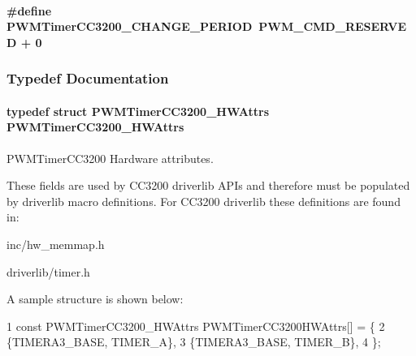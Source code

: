 \paragraph[{P\+W\+M\+Timer\+C\+C3200\+\_\+\+C\+H\+A\+N\+G\+E\+\_\+\+P\+E\+R\+I\+O\+D}]{\setlength{\rightskip}{0pt plus 5cm}\#define P\+W\+M\+Timer\+C\+C3200\+\_\+\+C\+H\+A\+N\+G\+E\+\_\+\+P\+E\+R\+I\+O\+D~{\bf P\+W\+M\+\_\+\+C\+M\+D\+\_\+\+R\+E\+S\+E\+R\+V\+E\+D} + 0}\label{_p_w_m_timer_c_c3200_8h_aec237c3c3e2a1f975437d65cae9bf004}


\subsubsection{Typedef Documentation}
\paragraph[{P\+W\+M\+Timer\+C\+C3200\+\_\+\+H\+W\+Attrs}]{\setlength{\rightskip}{0pt plus 5cm}typedef struct {\bf P\+W\+M\+Timer\+C\+C3200\+\_\+\+H\+W\+Attrs}  {\bf P\+W\+M\+Timer\+C\+C3200\+\_\+\+H\+W\+Attrs}}\label{_p_w_m_timer_c_c3200_8h_aa7bd34f367c1c6cb5b06d68a5942bbec}


P\+W\+M\+Timer\+C\+C3200 Hardware attributes. 

These fields are used by C\+C3200 driverlib A\+P\+Is and therefore must be populated by driverlib macro definitions. For C\+C3200 driverlib these definitions are found in\+:
\begin{DoxyItemize}
\item inc/hw\+\_\+memmap.\+h
\item driverlib/timer.\+h
\end{DoxyItemize}

A sample structure is shown below\+: 
\begin{DoxyCode}
1 const PWMTimerCC3200\_HWAttrs PWMTimerCC3200HWAttrs[] = \{
2     \{TIMERA3\_BASE, TIMER\_A\},
3     \{TIMERA3\_BASE, TIMER\_B\},
4 \};
\end{DoxyCode}
